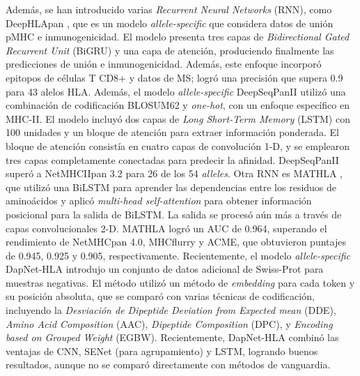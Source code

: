 Además, se han introducido varias \textit{Recurrent Neural Networks} (RNN), como DeepHLApan \citep{wu2019deephlapan}, que es un modelo \textit{allele-specific} que considera datos de unión pMHC e inmunogenicidad. El modelo presenta tres capas de \textit{Bidirectional Gated Recurrent Unit} (BiGRU) y una capa de atención, produciendo finalmente las predicciones de unión e inmunogenicidad. Además, este enfoque incorporó epitopos de células T CD8+ y datos de MS; logró una precisión que supera 0.9 para 43 alelos HLA. Además, el modelo \textit{allele-specific} DeepSeqPanII \citep{liu2021deepseqpanii} utilizó una combinación de codificación BLOSUM62 y \textit{one-hot}, con un enfoque específico en MHC-II. El modelo incluyó dos capas de \textit{Long Short-Term Memory} (LSTM) con 100 unidades y un bloque de atención para extraer información ponderada. El bloque de atención consistía en cuatro capas de convolución 1-D, y se emplearon tres capas completamente conectadas para predecir la afinidad. DeepSeqPanII superó a NetMHCIIpan 3.2 para 26 de los 54 \textit{alleles}. Otra RNN es MATHLA \citep{ye2021mathla}, que utilizó una BiLSTM para aprender las dependencias entre los residuos de aminoácidos y aplicó \textit{multi-head self-attention} para obtener información posicional para la salida de BiLSTM. La salida se procesó aún más a través de capas convolucionales 2-D. MATHLA logró un AUC de 0.964, superando el rendimiento de NetMHCpan 4.0, MHCflurry y ACME, que obtuvieron puntajes de 0.945, 0.925 y 0.905, respectivamente. Recientemente, el modelo \textit{allele-specific} DapNet-HLA \citep{jing2023dapnet} introdujo un conjunto de datos adicional de Swiss-Prot para muestras negativas. El método utilizó un método de \textit{embedding} para cada token y su posición absoluta, que se comparó con varias técnicas de codificación, incluyendo la \textit{Desviación de Dipeptide Deviation from Expected mean} (DDE), \textit{Amino Acid Composition} (AAC), \textit{Dipeptide Composition} (DPC), y \textit{Encoding based on Grouped Weight} (EGBW). Recientemente, DapNet-HLA combinó las ventajas de CNN, SENet (para agrupamiento) y LSTM, logrando buenos resultados, aunque no se comparó directamente con métodos de vanguardia.


